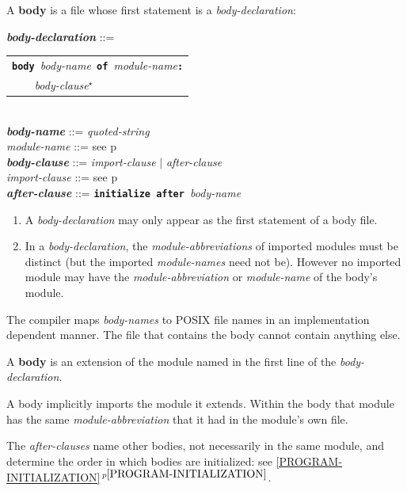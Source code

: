 \documentclass[12pt]{article}
\newcommand{\TT}[1]{{\tt \bfseries #1}}
\newcommand{\STAR}{{\Large $^\star$}}
\newcommand{\key}[1]{{\rm \bfseries #1}}
\newcommand{\ttkey}[1]{{\tt \bfseries #1}}
\newcommand{\emkey}[1]{{\em \bfseries #1}}
\newcommand{\itemref}[1]{\ref{#1}$\,^{p\pageref{#1}}$}
\newcommand{\pagref}[1]{p\pageref{#1}}
\newenvironment{indpar}[1][0.3in]%
	{\begin{list}{}%
		     {\setlength{\itemsep}{0in}%
		      \setlength{\topsep}{0in}%
		      \setlength{\parsep}{1ex}%
		      \setlength{\labelwidth}{#1}%
		      \setlength{\leftmargin}{#1}%
		      \addtolength{\leftmargin}{\labelsep}}%
	 \item}%
	{\end{list}}
\begin{document}
A \key{body} is a file whose first statement is a {\em body-declaration}:

\begin{indpar}
\emkey{body-declaration}\label{BODY-DECLARATION} ::=
    \begin{tabular}[t]{l}
    \TT{body }{\em body-name}\TT{ of }{\em module-name}\TT{:} \\
    \TT{~~~~}{\em body-clause}\STAR{} \\
    \end{tabular}
\\[0.5ex]
\emkey{body-name} ::= {\em quoted-string}
\\[0.5ex]
{\em module-name} ::= see \pagref{MODULE-NAME}
\\[0.5ex]
\emkey{body-clause} ::= {\em import-clause} $|$ {\em after-clause}
\\[0.5ex]
{\em import-clause} ::= see \pagref{IMPORT-CLAUSE}
\\[0.5ex]
\emkey{after-clause} ::= \ttkey{initialize after }{\em body-name}

\begin{enumerate}

\item
A {\em body-declaration} may only appear as the first statement
of a body file.

\item
In a {\em body-declaration}, the {\em module-abbreviations} of imported
modules must be distinct (but the imported {\em module-names} need not be).
However no imported module may have the 
{\em module-abbreviation} or {\em module-name} of the body's module.
\end{enumerate}

\end{indpar}

The compiler maps {\em body-names} to POSIX file names in an
implementation dependent manner.  The file that contains the
body cannot contain anything else.

A \key{body} is an extension of the module named in the first
line of the {\em body-declaration}.

A body implicitly imports the module it extends.  Within the
body that module has the same {\em module-abbreviation} that it
had in the module's own file.

The {\em after-clauses} name other bodies, not necessarily in
the same module,
and determine the order in which bodies are initialized:
see \itemref{PROGRAM-INITIALIZATION}.
\end{document}
